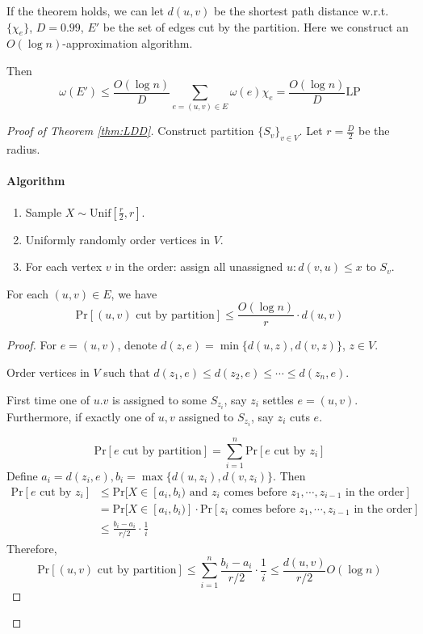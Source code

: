 If the theorem holds, we can let  $ d(u,v) $ be the shortest path distance w.r.t.  $ \{\chi_e\} $,  $ D=0.99 $,  $ E' $ be the set of edges cut by the partition. Here we construct an  $ O(\log n) $-approximation algorithm. 

Then 
\[\omega(E') \leq \frac{O(\log n)}{D}\sum_{e=(u,v)\in E}\omega(e)\chi_e=\frac{O(\log n)}{D}\mathrm{LP}\]

\begin{proof}[Proof of Theorem \ref{thm:LDD}]
    Construct partition  $ \{S_v\}_{v\in V} $. Let  $ r=\frac{D}{2} $ be the radius.
    
    \paragraph{Algorithm}
    \begin{enumerate}[label=\arabic*.]
        \item Sample  $ X\sim \mathrm{Unif}[\frac{r}{2},r] $.
        \item Uniformly randomly  order vertices in  $ V $.
        \item For each vertex  $ v $ in the order: assign all unassigned  $ u:d(v,u) \leq x $ to  $ S_v $.    
    \end{enumerate}
    \begin{claim}
        For each  $ (u,v)\in E $, we have 
        \[\mathrm{Pr}[(u,v)\text{ cut by partition}] \leq \frac{O(\log n)}{r}\cdot d(u,v)\] 
    \end{claim}
    \begin{proof}
        For  $ e=(u,v) $, denote  $ d(z,e)=\min\{d(u,z),d(v,z)\} $,  $ z\in V $.
        
        Order vertices in  $ V $ such that  $ d(z_1,e) \leq d(z_2,e) \leq \cdots \leq d(z_n,e) $.
        
        First time one of  $ u.v  $ is assigned to some  $ S_{z_i} $, say  $ z_i  $ settles  $ e=(u,v) $. Furthermore, if exactly one of  $ u,v  $ assigned to  $ S_{z_i} $, say  $ z_i $ cuts  $ e $.
        
        \[\mathrm{Pr}[e\text{ cut by partition}]=\sum_{i=1}^n\mathrm{Pr}[e\text{ cut by }z_i]\]
        Define  $ a_i=d(z_i,e),b_i=\max\{d(u,z_i),d(v,z_i)\} $. Then  
        \[\begin{aligned}
            \mathrm{Pr}[e\text{ cut by }z_i]& \leq \mathrm{Pr}[X\in [a_i,b_i) \text{ and }z_i\text{ comes before }z_1,\cdots,z_{i-1} \text{ in the order}]\\
            &=\mathrm{Pr}[X\in [a_i,b_i)]\cdot\mathrm{Pr}[z_i\text{ comes before }z_1,\cdots,z_{i-1} \text{ in the order}]\\
            & \leq \frac{b_i-a_i}{r/2}\cdot \frac{1}{i}
        \end{aligned}\]
        Therefore, 
        \[\mathrm{Pr}[(u,v)\text{ cut by partition}] \leq \sum_{i=1}^n \frac{b_i-a_i}{r/2}\cdot\frac{1}{i} \leq \frac{d(u,v)}{r/2}O(\log n)\]
    \end{proof}
\end{proof}